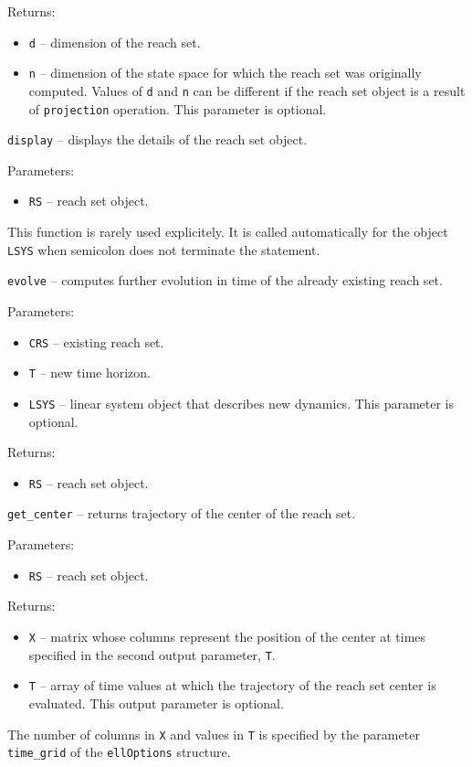 Returns:
\begin{itemize}
\item {\tt d} -- dimension of the reach set.
\item {\tt n} -- dimension of the state space for which the reach set was
originally computed. Values of {\tt d} and {\tt n} can be different if
the reach set object is a result of {\tt projection} operation.
This parameter is optional.
\end{itemize}

\newpage

{\Large {\tt display}} -- displays the details of the reach set object.

Parameters:
\begin{itemize}
\item {\tt RS} -- reach set object.
\end{itemize}
This function is rarely used explicitely. It is called automatically
for the object {\tt LSYS} when semicolon does not terminate the statement.

\newpage

{\Large {\tt evolve}} -- computes further evolution in time of the already
existing reach set.

Parameters:
\begin{itemize}
\item {\tt CRS} -- existing reach set.
\item {\tt T} -- new time horizon.
\item {\tt LSYS} -- linear system object that describes new dynamics.
This parameter is optional.
\end{itemize}

Returns:
\begin{itemize}
\item {\tt RS} -- reach set object.
\end{itemize}

\newpage

{\Large {\tt get\_center}} -- returns trajectory of the center of the reach set.

Parameters:
\begin{itemize}
\item {\tt RS} -- reach set object.
\end{itemize}

Returns:
\begin{itemize}
\item {\tt X} -- matrix whose columns represent the position of the center
at times specified in the second output parameter, {\tt T}.
\item {\tt T} -- array of time values at which the trajectory of the reach set
center is evaluated. This output parameter is optional.
\end{itemize}
The number of columns in {\tt X} and values in {\tt T}
is specified by the parameter
{\tt time\_grid} of the {\tt ellOptions} structure.

